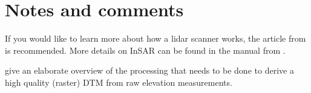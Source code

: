 

%
\section{Notes and comments}
If you would like to learn more about how a lidar scanner works, the article from \citet{Wehr99} is recommended.
More details on InSAR can be found in the manual from \citet{ESA07}.

\citet{Reuter09} give an elaborate overview of the processing that needs to be done to derive a high quality (raster) DTM from raw elevation measurements.


